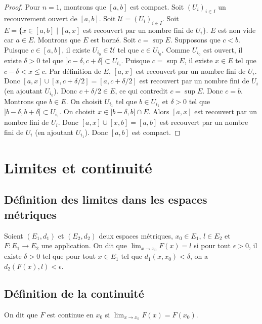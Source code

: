 \documentclass[oneside]{book}
\begin{document}
\begin{proof}
Pour $n=1$, montrons que $[a, b]$ est compact. Soit $(U_i)_{i \in I}$ un recouvrement ouvert de $[a, b]$. Soit $\mathcal{U} = (U_i)_{i \in I}$.
Soit $E = \{x \in [a, b] \mid [a, x] \text{ est recouvert par un nombre fini de } U_i \}$.
$E$ est non vide car $a \in E$. Montrons que $E$ est borné.
Soit $c = \sup E$. Supposons que $c < b$. Puisque $c \in [a, b]$, il existe $U_{i_0} \in \mathcal{U}$ tel que $c \in U_{i_0}$. Comme $U_{i_0}$ est ouvert, il existe $\delta > 0$ tel que $]c - \delta, c + \delta[ \subset U_{i_0}$.
Puisque $c = \sup E$, il existe $x \in E$ tel que $c - \delta < x \leq c$. Par définition de $E$, $[a, x]$ est recouvert par un nombre fini de $U_i$.
Donc $[a, x] \cup [x, c + \delta/2] = [a, c + \delta/2]$ est recouvert par un nombre fini de $U_i$ (en ajoutant $U_{i_0}$). Donc $c + \delta/2 \in E$, ce qui contredit $c = \sup E$. Donc $c = b$.
Montrons que $b \in E$. On choisit $U_{i_1}$ tel que $b \in U_{i_1}$ et $\delta > 0$ tel que $]b - \delta, b + \delta[ \subset U_{i_1}$. On choisit $x \in ]b - \delta, b] \cap E$. Alors $[a, x]$ est recouvert par un nombre fini de $U_i$. Donc $[a, x] \cup [x, b] = [a, b]$ est recouvert par un nombre fini de $U_i$ (en ajoutant $U_{i_1}$). Donc $[a, b]$ est compact.
\end{proof}

\section{Limites et continuité}

\subsection{Définition des limites dans les espaces métriques}

\begin{definition}[Limite]
Soient $(E_1, d_1)$ et $(E_2, d_2)$ deux espaces métriques, $x_0 \in E_1$, $l \in E_2$ et $F : E_1 \to E_2$ une application. On dit que $\lim_{x \to x_0} F(x) = l$ si pour tout $\epsilon > 0$, il existe $\delta > 0$ tel que pour tout $x \in E_1$ tel que $d_1(x, x_0) < \delta$, on a $d_2(F(x), l) < \epsilon$.
\end{definition}

\subsection{Définition de la continuité}

\begin{definition}
On dit que $F$ est continue en $x_0$ si $\lim_{x \to x_0} F(x) = F(x_0)$.
\end{definition}
\end{document}
